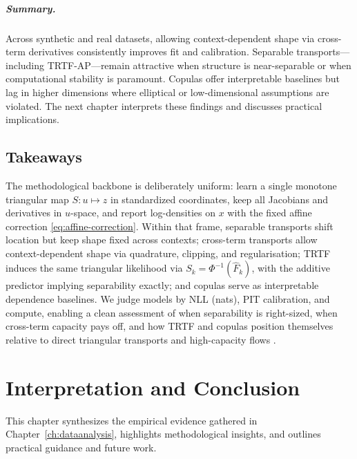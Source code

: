 \documentclass[11pt,a4paper,twoside]{book}\usepackage[]{graphicx}\usepackage[]{xcolor}
\begin{document}
\paragraph{Summary.} Across synthetic and real datasets, allowing context-dependent shape via cross-term derivatives consistently improves fit and calibration. Separable transports---including TRTF-AP---remain attractive when structure is near-separable or when computational stability is paramount. Copulas offer interpretable baselines but lag in higher dimensions where elliptical or low-dimensional assumptions are violated. The next chapter interprets these findings and discusses practical implications.
\section{Takeaways}

The methodological backbone is deliberately uniform: learn a single monotone triangular map $S:u\mapsto z$ in standardized coordinates, keep all Jacobians and derivatives in $u$-space, and report log-densities on $x$ with the fixed affine correction \eqref{eq:affine-correction}. Within that frame, separable transports shift location but keep shape fixed across contexts; cross-term transports allow context-dependent shape via quadrature, clipping, and regularisation; TRTF induces the same triangular likelihood via $S_k=\Phi^{-1}(\widehat{F}_k)$, with the additive predictor implying separability exactly; and copulas serve as interpretable dependence baselines. We judge models by NLL (nats), PIT calibration, and compute, enabling a clean assessment of when separability is right-sized, when cross-term capacity pays off, and how TRTF and copulas position themselves relative to direct triangular transports and high-capacity flows \citep{rosenblatt1952remarks,knothe1957contributions,hothorn2017transformation,hothorn2021transformation,hothorn2018conditional,ramgraber2025friendly,sklar1959fonctions,rezende2015variational,dinh2017real,papamakarios2021normalizing}.






\chapter{Interpretation and Conclusion}\label{ch:conclusion}

This chapter synthesizes the empirical evidence gathered in Chapter~\ref{ch:dataanalysis}, highlights methodological insights, and outlines practical guidance and future work.
\end{document}
